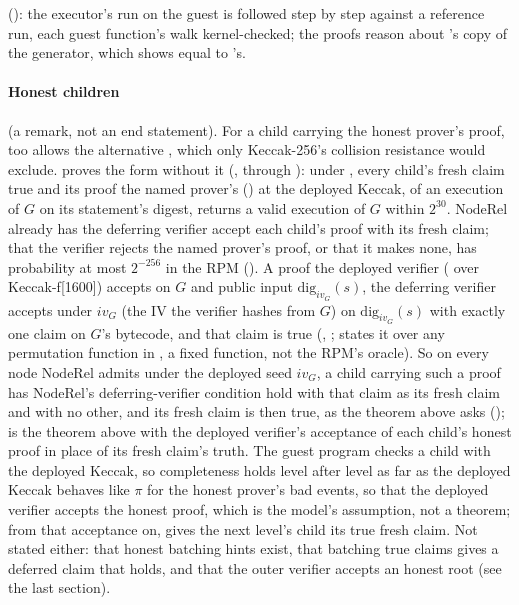 \documentclass[11pt]{article}
\begin{document}
(): the executor's run on the guest is followed step by step against a reference run, each guest function's walk kernel-checked; the proofs reason about 's copy of the generator, which  shows equal to 's.

\paragraph{Honest children} (a  remark, not an end statement). For a child carrying the honest prover's proof,  too allows the alternative , which only Keccak-256's collision resistance would exclude.  proves the form without it (, through ): under , every child's fresh claim true and its proof the named prover's () at the deployed Keccak, of an execution of $G$ on its statement's digest,  returns a valid execution of $G$ within $2^{30}$. $\mathrm{NodeRel}$ already has the deferring verifier accept each child's proof with its fresh claim; that the verifier rejects the named prover's proof, or that it makes none, has probability at most $2^{-256}$ in the RPM (). A proof the deployed verifier ( over Keccak-f[1600]) accepts on $G$ and public input $\mathrm{dig}_{iv_G}(s)$, the deferring verifier accepts under $iv_G$ (the IV the verifier hashes from $G$) on $\mathrm{dig}_{iv_G}(s)$ with exactly one claim on $G$'s bytecode, and that claim is true (, ;  states it over any permutation function in , a fixed function, not the RPM's oracle). So on every node $\mathrm{NodeRel}$ admits under the deployed seed $iv_G$, a child carrying such a proof has $\mathrm{NodeRel}$'s deferring-verifier condition hold with that claim as its fresh claim and with no other, and its fresh claim is then true, as the theorem above asks ();  is the theorem above with the deployed verifier's acceptance of each child's honest proof in place of its fresh claim's truth. The guest program checks a child with the deployed Keccak, so completeness holds level after level as far as the deployed Keccak behaves like $\pi$ for the honest prover's bad events, so that the deployed verifier accepts the honest proof, which is the model's assumption, not a theorem; from that acceptance on,  gives the next level's child its true fresh claim. Not stated either: that honest batching hints exist, that batching true claims gives a deferred claim that holds, and that the outer verifier accepts an honest root (see the last section).
\end{document}
